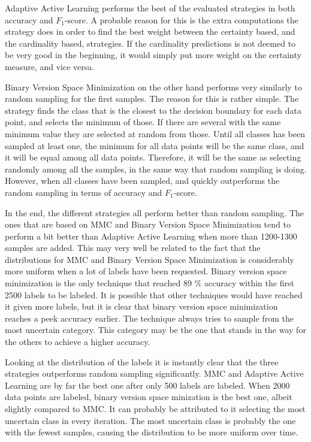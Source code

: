 Adaptive Active Learning performs the best of the evaluated strategies in both accuracy and $F_1$-score. 
A probable reason for this is the extra computations the strategy does in order to find the best weight between the certainty based, and the cardinality based, strategies.
If the cardinality predictions is not deemed to be very good in the beginning, it would simply put more weight on the certainty measure, and vice versa.

Binary Version Space Minimization on the other hand performs very similarly to random sampling for the first samples.
The reason for this is rather simple.
The strategy finds the class that is the closest to the decision boundary for each data point, and selects the minimum of those.
If there are several with the same minimum value they are selected at random from those.
Until all classes has been sampled at least one, the minimum for all data points will be the same class, and it will be equal among all data points.
Therefore, it will be the same as selecting randomly among all the samples, in the same way that random sampling is doing.
However, when all classes have been sampled, and quickly outperforms the random sampling in terms of accuracy and $F_1$-score.

In the end, the different strategies all perform better than random sampling.
The ones that are based on MMC and Binary Version Space Minimization tend to perform a bit better than Adaptive Active Learning when more than 1200-1300 samples are added.
This may very well be related to the fact that the distributions for MMC and Binary Version Space Minimization is considerably more uniform when a lot of labels have been requested.
Binary version space minimization is the only technique that reached 89 \% accuracy within the first 2500 labels to be labeled.
It is possible that other techniques would have reached it given more labels, but it is clear that binary version space minimization reaches a peek accuracy earlier.
The technique always tries to sample from the most uncertain category.
This category may be the one that stands in the way for the others to achieve a higher accuracy.

Looking at the distribution of the labels it is instantly clear that the three strategies outperforms random sampling significantly.
MMC and Adaptive Active Learning are by far the best one after only 500 labels are labeled.
When 2000 data points are labeled, binary version space minization is the best one, albeit slightly compared to MMC.
It can probably be attributed to it selecting the most uncertain class in every iteration.
The most uncertain class is probably the one with the fewest samples, causing the distribution to be more uniform over time.

